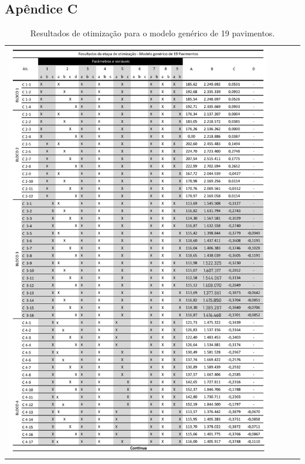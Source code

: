 \subsection{Apêndice C}
\begin{table}[H]
    \centering
    \caption{Resultados de otimização para o modelo genérico de 19 pavimentos.}
    \begin{tabular}{l}
        \includegraphics[width=0.9\textwidth]{figures/appendices/tabela05.png}
    \end{tabular}
    \label{tab:20}
\end{table}
\pagebreak
